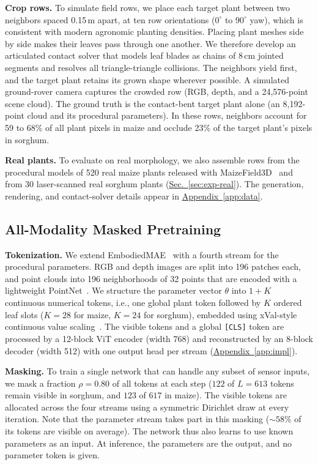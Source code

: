 \documentclass[10pt,twocolumn,letterpaper]{article}
\newcommand{\secref}[1]{\hyperref[#1]{Sec.~\ref*{#1}}}
\newcommand{\appendixref}[1]{\hyperref[#1]{Appendix~\ref*{#1}}}
\begin{document}
\noindent\textbf{Crop rows.}
To simulate field rows, we place each target plant between two neighbors spaced 0.15\,m apart, at ten row orientations ($0^\circ$ to $90^\circ$ yaw),  which is consistent with modern agronomic planting densities. Placing plant meshes side by side makes their leaves pass through one another. We therefore develop an articulated contact solver that models leaf blades as chains of 8\,cm jointed segments and resolves all triangle-triangle collisions. The neighbors yield first, and the target plant retains its grown shape wherever possible. A simulated ground-rover camera captures the crowded row (RGB, depth, and a 24{,}576-point scene cloud). The ground truth is the contact-bent target plant alone (an 8{,}192-point cloud and its procedural parameters). In these rows, neighbors account for 59 to 68\% of all plant pixels in maize and occlude 23\% of the target plant's pixels in sorghum.

\noindent\textbf{Real plants.}
To evaluate on real morphology, we also assemble rows from the procedural models of 520 real maize plants released with MaizeField3D~\citep{maizefield3d2025} and from 30 laser-scanned real sorghum plants (\secref{sec:exp-real}). The generation, rendering, and contact-solver details appear in \appendixref{app:data}.

\subsection{All-Modality Masked Pretraining}
\label{sec:method-pretrain}

\noindent\textbf{Tokenization.}
We extend EmbodiedMAE~\citep{dong2025embodiedmae} with a fourth stream for the procedural parameters. RGB and depth images are split into 196 patches each, and point clouds into 196 neighborhoods of 32 points that are encoded with a lightweight PointNet~\citep{pang2022pointmae,qi2017pointnet}. We structure the parameter vector $\theta$ into $1 + K$ continuous numerical tokens, i.e., one global plant token followed by $K$ ordered leaf slots ($K = 28$ for maize, $K = 24$ for sorghum), embedded using xVal-style continuous value scaling~\citep{golkar2023xval}. The visible tokens and a global \texttt{[CLS]} token are processed by a 12-block ViT encoder (width 768) and reconstructed by an 8-block decoder (width 512) with one output head per stream (\appendixref{app:impl}).

\noindent\textbf{Masking.}
To train a single network that can handle any subset of sensor inputs, we mask a fraction $\rho = 0.80$ of all tokens at each step ($122$ of $L = 613$ tokens remain visible in sorghum, and $123$ of $617$ in maize). The visible tokens are allocated across the four streams using a symmetric Dirichlet draw at every iteration. Note that the parameter stream takes part in this masking ($\sim 58\%$ of its tokens are visible on average). The network thus also learns to use known parameters as an input. At inference, the parameters are the output, and no parameter token is given. %
\end{document}
